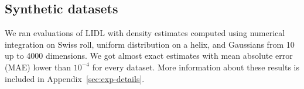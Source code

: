 \subsection{Synthetic datasets}
\label{sec:other-perfect-datasets}
We ran evaluations of LIDL with density estimates computed using numerical integration on Swiss roll, uniform distribution on a helix, and Gaussians from 10 up to 4000 dimensions. We got almost exact estimates with mean absolute error (MAE) lower than $10^{-4}$ for every dataset. More information about these results is included in Appendix~\ref{sec:exp-details}.
